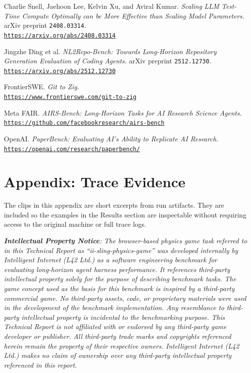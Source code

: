 \documentclass[11pt,a4paper]{article}
\newcommand{\ipnoticebody}{\textit{\textbf{Intellectual Property Notice}: The browser-based physics game task referred to in this Technical Report as ``ii-sling-physics-game'' was developed internally by Intelligent Internet (L42 Ltd.) as a software engineering benchmark for evaluating long-horizon agent harness performance. It references third-party intellectual property solely for the purpose of describing benchmark tasks. The game concept used as the basis for this benchmark is inspired by a third-party commercial game. No third-party assets, code, or proprietary materials were used in the development of the benchmark implementation. Any resemblance to third-party intellectual property is incidental to the benchmarking purpose. This Technical Report is not affiliated with or endorsed by any third-party game developer or publisher. All third-party trade marks and copyrights referenced herein remain the property of their respective owners. Intelligent Internet (L42 Ltd.) makes no claim of ownership over any third-party intellectual property referenced in this report.}}
\begin{document}
\begin{enumerate}[leftmargin=2.0em,label={[\arabic*]}]
  \item Charlie Snell, Jaehoon Lee, Kelvin Xu, and Aviral Kumar. \emph{Scaling LLM Test-Time Compute Optimally can be More Effective than Scaling Model Parameters.} arXiv preprint \texttt{2408.03314}.\\
    \href{https://arxiv.org/abs/2408.03314}{\nolinkurl{https://arxiv.org/abs/2408.03314}}

  \item Jingzhe Ding et al. \emph{NL2Repo-Bench: Towards Long-Horizon Repository Generation Evaluation of Coding Agents.} arXiv preprint \texttt{2512.12730}.\\
    \href{https://arxiv.org/abs/2512.12730}{\nolinkurl{https://arxiv.org/abs/2512.12730}}

  \item FrontierSWE. \emph{Git to Zig.}\\
    \href{https://www.frontierswe.com/git-to-zig}{\nolinkurl{https://www.frontierswe.com/git-to-zig}}

  \item Meta FAIR. \emph{AIRS-Bench: Long-Horizon Tasks for AI Research Science Agents.}\\
    \href{https://github.com/facebookresearch/airs-bench}{\nolinkurl{https://github.com/facebookresearch/airs-bench}}

  \item OpenAI. \emph{PaperBench: Evaluating AI's Ability to Replicate AI Research.}\\
    \href{https://openai.com/research/paperbench/}{\nolinkurl{https://openai.com/research/paperbench/}}
\end{enumerate}
\endgroup

\clearpage
\section{Appendix: Trace Evidence}

The clips in this appendix are short excerpts from run artifacts. They are included so the examples in the Results section are inspectable without requiring access to the original machine or full trace logs.

\vspace{6pt}
\begin{takeaway}
\footnotesize\ipnoticebody
\end{takeaway}
\vspace{6pt}
\end{document}
